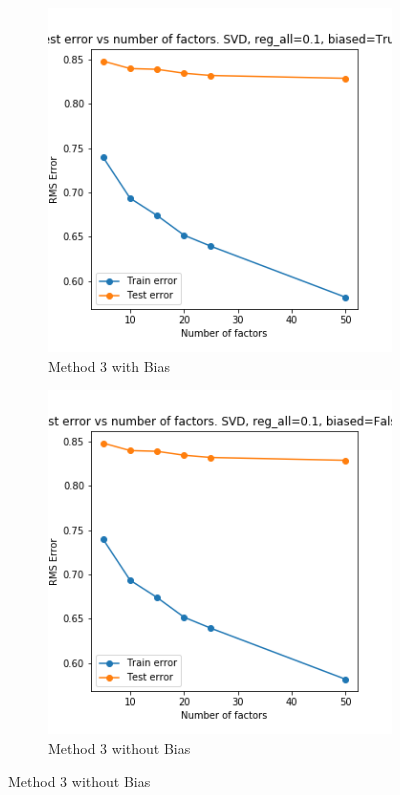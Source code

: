 \begin{figure}[H]
	\centering
	\begin{subfigure}[t]{0.3\textwidth}
		\centering
		\includegraphics[width=\textwidth]{Surprise_EpB}
		\caption{Method 3 with Bias}
	\end{subfigure}
	\begin{subfigure}[t]{0.3\textwidth}
		\centering
		\includegraphics[width=\textwidth]{Surprise_EpNoB}
		\caption{Method 3 without Bias}
	\end{subfigure}
\end{figure}

